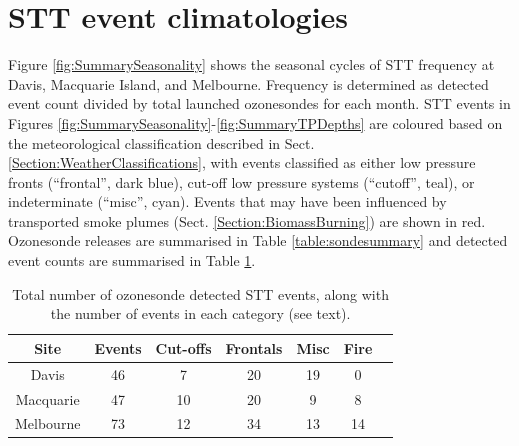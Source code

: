 \documentclass[acp, manuscript]{copernicus} %
\begin{document}
\section{STT event climatologies}
  \label{sec:eventclimatologies}
  Figure \ref{fig:SummarySeasonality} shows the seasonal cycles of STT frequency at Davis, Macquarie Island, and Melbourne.
  Frequency is determined as detected event count divided by total launched ozonesondes for each month.
  STT events in Figures \ref{fig:SummarySeasonality}-\ref{fig:SummaryTPDepths} are coloured based on the meteorological classification described in Sect. \ref{Section:WeatherClassifications}, with events classified as either low pressure fronts (“frontal”, dark blue), cut-off low pressure systems (“cutoff”, teal), or indeterminate (“misc”, cyan).
  Events that may have been influenced by transported smoke plumes (Sect. \ref{Section:BiomassBurning}) are shown in red.
  Ozonesonde releases are summarised in Table \ref{table:sondesummary} and detected event counts are summarised in Table \ref{table:EventCounts}.
  \begin{table}[t]
    \caption{Total number of ozonesonde detected STT events, along with the number of events in each category (see text).}
    \begin{tabular}{ c   c   c   c   c   c   c } 
      \hline
      Site & Events & Cut-offs & Frontals & Misc & Fire \\
      \hline
      Davis     & 46 & 7  & 20 & 19 & 0 \\ 
      Macquarie & 47 & 10 & 20 & 9  & 8 \\
      Melbourne & 73 & 12 & 34 & 13 & 14 \\
      \hline
    \end{tabular}
    \label{table:EventCounts}
  \end{table}
  
\end{document}
